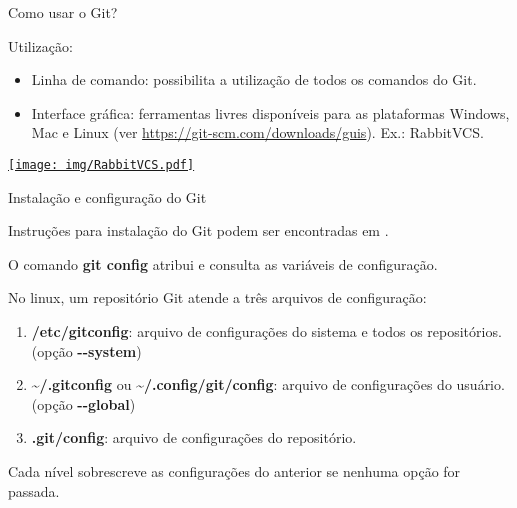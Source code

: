 \documentclass[a4paper]{beamer}
\begin{document}
\begin{frame}{Como usar o Git?}

Utilização:
\begin{itemize}
\item Linha de comando: possibilita a utilização de todos os comandos do Git.
\item Interface gráfica: ferramentas livres disponíveis para as plataformas Windows, Mac e Linux (ver \url{https://git-scm.com/downloads/guis}). Ex.: RabbitVCS.
\end{itemize}

\begin{center}
\href{http://rabbitvcs.org/}{\texttt{[image: img/RabbitVCS.pdf]}}
\end{center}

\end{frame}

\begin{frame}{Instalação e configuração do Git}

Instruções para instalação do Git podem ser encontradas em \cite{proGit}.
\pause

\vspace{10pt}
O comando \textbf{git config} atribui e consulta as variáveis de configuração.

\vspace{10pt}
No linux, um repositório Git atende a três arquivos de configuração:
\begin{enumerate}[<+->]
\item \textbf{/etc/gitconfig}: arquivo de configurações do sistema e todos os repositórios. (opção \textbf{-{}-system})
\item \textbf{\textasciitilde /.gitconfig} ou \textbf{\textasciitilde /.config/git/config}: arquivo de configurações do usuário. (opção \textbf{-{}-global})
\item \textbf{.git/config}: arquivo de configurações do repositório.
\end{enumerate}

\vspace{10pt}
Cada nível sobrescreve as configurações do anterior se nenhuma opção for passada.

\end{frame}
\end{document}
